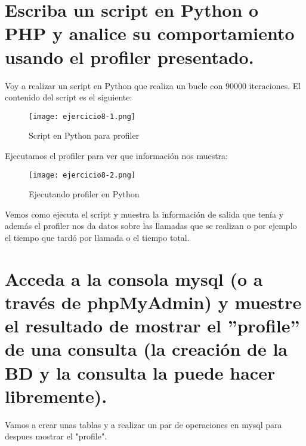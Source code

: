 	\section{Escriba un script en Python o PHP y analice su comportamiento usando el profiler presentado.}
	
	Voy a realizar un script en Python\cite{ejercicio8-1} que realiza un bucle con 90000 iteraciones. El contenido del script es el siguiente:
	\begin{figure}[H] 
		\centering
		\texttt{[image: ejercicio8-1.png]} 
		\label{figura2} 			
		\caption{Script en Python para profiler}
	\end{figure}
	
	Ejecutamos el profiler para ver que información nos muestra:
	\begin{figure}[H] 
		\centering
		\texttt{[image: ejercicio8-2.png]} 
		\label{figura2} 			
		\caption{Ejecutando profiler en Python}
	\end{figure}
	
	Vemos como ejecuta el script y muestra la información de salida que tenía y además el profiler nos da datos sobre las llamadas que se realizan o por ejemplo el tiempo que tardó por llamada o el tiempo total.
	\section{Acceda a la consola mysql (o a través de phpMyAdmin) y muestre el resultado de mostrar el ”profile” de una consulta (la creación de la BD y la consulta la puede hacer libremente).}
	
	Vamos a crear unas tablas y a realizar un par de operaciones en mysql para despues mostrar el "profile"\cite{ejercicio9-1}.

